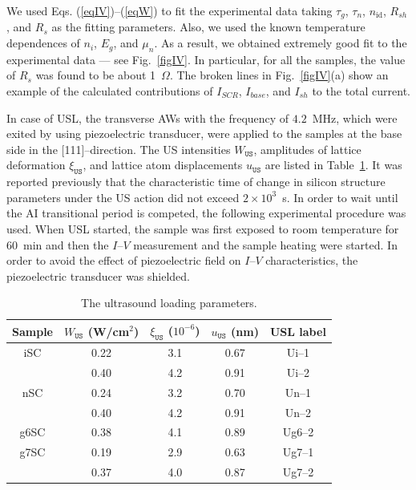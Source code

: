 \documentclass[aip,jap, amsmath,amssymb,reprint]{revtex4-1}
\begin{document}
We used Eqs. (\ref{eqIV})--(\ref{eqW}) to fit the experimental data taking $\tau_g$, $\tau_n$, $n_{\mathrm{id}}$, $R_{sh}$, and $R_s$ as the  fitting parameters.
Also, we used the known \cite{ni:Green,Schroder2006,Markvart} temperature dependences of $n_i$, $E_g$, and $\mu_n$.
As a result, we obtained extremely good fit to the experimental data --- see Fig.~\ref{figIV}.
In particular, for all the samples, the value of $R_s$ was found to be about 1~$\Omega$.
The broken lines in Fig.~\ref{figIV}(a) show an example of the calculated contributions of $I_{SCR}$, $I_{base}$, and $I_{sh}$ to the total current.

In case of USL, the transverse AWs with the frequency of $4.2$~MHz, which were exited by using piezoelectric transducer,  were applied to the samples at the base side in the [111]--direction.
The US intensities $W_{\mathtt{US}}$, amplitudes of lattice deformation $\xi_{\mathtt{US}}$, and lattice atom
displacements  $u_{\mathtt{US}}$ are listed in Table~\ref{tabUSL}.
It was reported previously \cite{Ostapenko1995,Olikh:Ultras,Ostrovskii2001} that the characteristic time of change in silicon structure parameters under
the US action  did not exceed $2\times10^3$~s.
In order to wait until the AI transitional period is competed, the following experimental procedure was used.
When USL started, the sample was first exposed to room temperature for 60~min and then the $I$--$V$ measurement and the sample heating were started.
In order to avoid the effect of piezoelectric field on $I$--$V$ characteristics, the piezoelectric transducer was shielded.

\begin{table}
\caption{\label{tabUSL}The ultrasound loading parameters.
}
\begin{ruledtabular}
\begin{tabular}{ccccc}
Sample&$W_{\mathtt{US}}$ (W/cm$^2$)&$\xi_{\mathtt{US}}$ ($10^{-6}$)&$u_{\mathtt{US}}$ (nm)&USL label\\
\hline
iSC&0.22&3.1&0.67&Ui--1\\
&0.40&4.2&0.91&Ui--2\\
nSC&0.24&3.2&0.70&Un--1\\
&0.40&4.2&0.91&Un--2\\
g6SC&0.38&4.1&0.89&Ug6--2\\
g7SC&0.19&2.9&0.63&Ug7--1\\
&0.37&4.0&0.87&Ug7--2\\
\end{tabular}
\end{ruledtabular}
\end{table}
\end{document}
